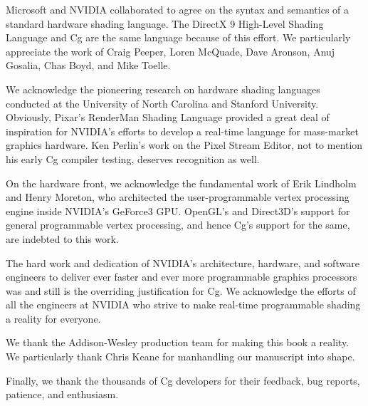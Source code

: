 \documentclass[../main.tex]{subfiles}
\begin{document}
Microsoft and NVIDIA collaborated to agree on the syntax and semantics of a standard hardware shading language. The DirectX 9 High-Level Shading Language and Cg are the same language because of this effort. We particularly appreciate the work of Craig Peeper, Loren McQuade, Dave Aronson, Anuj Gosalia, Chas Boyd, and Mike Toelle.

We acknowledge the pioneering research on hardware shading languages conducted at the University of North Carolina and Stanford University. Obviously, Pixar's RenderMan Shading Language provided a great deal of inspiration for NVIDIA's efforts to develop a real-time language for mass-market graphics hardware. Ken Perlin's work on the Pixel Stream Editor, not to mention his early Cg compiler testing, deserves recognition as well.

On the hardware front, we acknowledge the fundamental work of Erik Lindholm and Henry Moreton, who architected the user-programmable vertex processing engine inside NVIDIA's GeForce3 GPU. OpenGL's and Direct3D's support for general programmable vertex processing, and hence Cg's support for the same, are indebted to this work.

The hard work and dedication of NVIDIA's architecture, hardware, and software engineers to deliver ever faster and ever more programmable graphics processors was and still is the overriding justification for Cg. We acknowledge the efforts of all the engineers at NVIDIA who strive to make real-time programmable shading a reality for everyone.

We thank the Addison-Wesley production team for making this book a reality. We particularly thank Chris Keane for manhandling our manuscript into shape.

Finally, we thank the thousands of Cg developers for their feedback, bug reports, patience, and enthusiasm.
\end{document}
